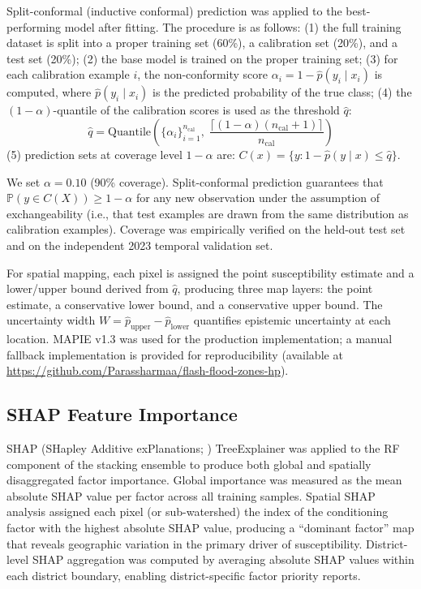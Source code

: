 Split-conformal (inductive conformal) prediction
\citep{angelopoulos2023conformal, taquet2022mapie}
was applied to the best-performing model after fitting.
The procedure is as follows:
(1) the full training dataset is split into a proper training set (60\%),
a calibration set (20\%), and a test set (20\%);
(2) the base model is trained on the proper training set;
(3) for each calibration example $i$, the non-conformity score
$\alpha_i = 1 - \hat{p}(y_i \mid x_i)$ is computed,
where $\hat{p}(y_i \mid x_i)$ is the predicted probability of the true class;
(4) the $(1-\alpha)$-quantile of the calibration scores is used as the threshold
$\hat{q}$:
\begin{equation}
  \hat{q} = \mathrm{Quantile}\!\left(
    \{\alpha_i\}_{i=1}^{n_\mathrm{cal}},\;
    \frac{\lceil (1-\alpha)(n_\mathrm{cal}+1) \rceil}{n_\mathrm{cal}}
  \right)
  \label{eq:conformal_quantile}
\end{equation}
(5) prediction sets at coverage level $1-\alpha$ are:
$C(x) = \{y : 1 - \hat{p}(y \mid x) \leq \hat{q}\}$.

We set $\alpha = 0.10$ (90\% coverage).
Split-conformal prediction guarantees that $\mathbb{P}(y \in C(X)) \geq 1-\alpha$
for any new observation under the assumption of exchangeability
(i.e., that test examples are drawn from the same distribution as calibration examples).
Coverage was empirically verified on the held-out test set
and on the independent 2023 temporal validation set.

For spatial mapping, each pixel is assigned the point susceptibility estimate
and a lower/upper bound derived from $\hat{q}$, producing three map layers:
the point estimate, a conservative lower bound, and a conservative upper bound.
The uncertainty width $W = \hat{p}_\mathrm{upper} - \hat{p}_\mathrm{lower}$
quantifies epistemic uncertainty at each location.
MAPIE v1.3 \citep{taquet2022mapie} was used for the production implementation;
a manual fallback implementation is provided for reproducibility
(available at \url{https://github.com/Parassharmaa/flash-flood-zones-hp}).

\subsection{SHAP Feature Importance}
\label{sec:shap}

SHAP (SHapley Additive exPlanations; \citealt{lundberg2017shap})
TreeExplainer was applied to the RF component of the stacking ensemble
to produce both global and spatially disaggregated factor importance.
Global importance was measured as the mean absolute SHAP value per factor
across all training samples.
Spatial SHAP analysis assigned each pixel (or sub-watershed) the index of the
conditioning factor with the highest absolute SHAP value,
producing a ``dominant factor'' map that reveals geographic variation
in the primary driver of susceptibility.
District-level SHAP aggregation was computed by averaging absolute SHAP values
within each district boundary, enabling district-specific factor priority reports.
